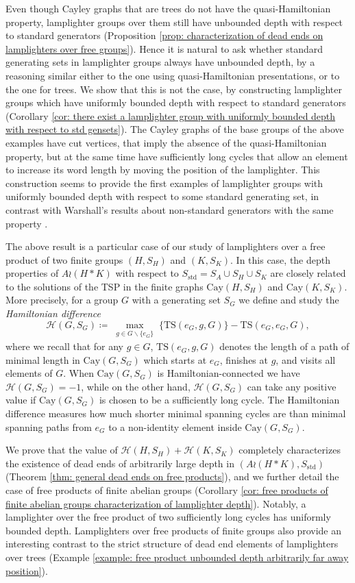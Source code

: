 \documentclass[reqno,oneside]{amsart}
\newcommand{\cay}[2]{\mathrm{Cay}(#1,#2)}
\newcommand{\std}{S_{\mathrm{std}}}
\newcommand{\TS}[3]{\mathrm{TS}\left(#1,#2,#3\right)}
\theoremstyle{plain}
\theoremstyle{definition}
\begin{document}
Even though Cayley graphs that are trees do not have the quasi-Hamiltonian property, lamplighter groups over them still have unbounded depth with respect to standard generators (Proposition \ref{prop: characterization of dead ends on lamplighters over free groups}).  Hence it is natural to ask whether standard generating sets in lamplighter groups always have unbounded depth, by a reasoning similar either to the one using quasi-Hamiltonian presentations, or to the one for trees. We show that this is not the case, by constructing lamplighter groups which have uniformly bounded depth with respect to standard generators (Corollary \ref{cor: there exist a lamplighter group with uniformly bounded depth with respect to std gensets}). The Cayley graphs of the base groups of the above examples have cut vertices, that imply the absence of the quasi-Hamiltonian property, but at the same time have sufficiently long cycles that allow an element to increase its word length by moving the position of the lamplighter. This construction seems to provide the first examples of lamplighter groups with uniformly bounded depth with respect to some standard generating set, in contrast with Warshall's results about non-standard generators with the same property \cite{warshall2008strongly}.


The above result is a particular case of our study of lamplighters over a free product of two finite groups $(H,S_H)$ and $(K,S_K)$. In this case, the depth properties of $A\wr (H*K)$ with respect to $\std=S_A\cup S_H\cup S_K$ are closely related to the solutions of the TSP in the finite graphs $\cay{H}{S_H}$ and $\cay{K}{S_K}$. More precisely, for a group $G$ with a generating set $S_G$ we define and study the \textit{Hamiltonian difference}
$$
\mathscr{H}(G,S_G)\coloneqq \max_{\substack{g\in G\backslash\{e_G\}}}\Big\{ \TS{e_G}{g}{G}\Big\}- \TS{e_G}{e_G}{G},
$$
where we recall that for any $g\in G$, $\TS{e_G}{g}{G}$ denotes the length of a path of minimal length in $\cay{G}{S_G}$ which starts at $e_G$, finishes at $g$, and visits all elements of $G$. When $\cay{G}{S_G}$ is Hamiltonian-connected we have $\mathscr{H}(G,S_G)=-1$, while on the other hand, $\mathscr{H}(G,S_G)$ can take any positive value if $\cay{G}{S_G}$ is chosen to be a sufficiently long cycle. The Hamiltonian difference measures how much shorter minimal spanning cycles are than minimal spanning paths from $e_G$ to a non-identity element inside $\cay{G}{S_G}$.



We prove that the value of $\mathscr{H}(H,S_H)+\mathscr{H}(K,S_K)$ completely characterizes the existence of dead ends of arbitrarily large depth in $(A\wr (H*K),\std)$ (Theorem \ref{thm: general dead ends on free products}), and we further detail the case of free products of finite abelian groups (Corollary \ref{cor: free products of finite abelian groups characterization of lamplighter depth}). Notably, a lamplighter over the free product of two sufficiently long cycles has uniformly bounded depth. Lamplighters over free products of finite groups also provide an interesting contrast to the strict structure of dead end elements of lamplighters over trees (Example \ref{example: free product unbounded depth arbitrarily far away position}).
\end{document}

